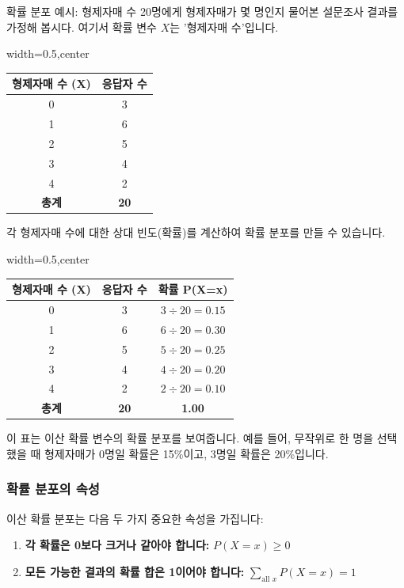 \documentclass[11pt,a4paper]{article}
\theoremstyle{definition}
\begin{document}
\begin{examplebox}{확률 분포 예시: 형제자매 수}
20명에게 형제자매가 몇 명인지 물어본 설문조사 결과를 가정해 봅시다. 여기서 확률 변수 \(X\)는 '형제자매 수'입니다.

\begin{adjustbox}{width=0.5\textwidth,center}
\begin{tabular}{cc}
\toprule
\textbf{형제자매 수 (X)} & \textbf{응답자 수} \\
\midrule
0 & 3 \\
1 & 6 \\
2 & 5 \\
3 & 4 \\
4 & 2 \\
\midrule
\textbf{총계} & \textbf{20} \\
\bottomrule
\end{tabular}
\end{adjustbox}

각 형제자매 수에 대한 상대 빈도(확률)를 계산하여 확률 분포를 만들 수 있습니다.

\begin{adjustbox}{width=0.5\textwidth,center}
\begin{tabular}{ccc}
\toprule
\textbf{형제자매 수 (X)} & \textbf{응답자 수} & \textbf{확률 P(X=x)} \\
\midrule
0 & 3 & \(3 \div 20 = 0.15\) \\
1 & 6 & \(6 \div 20 = 0.30\) \\
2 & 5 & \(5 \div 20 = 0.25\) \\
3 & 4 & \(4 \div 20 = 0.20\) \\
4 & 2 & \(2 \div 20 = 0.10\) \\
\midrule
\textbf{총계} & \textbf{20} & \textbf{1.00} \\
\bottomrule
\end{tabular}
\end{adjustbox}

이 표는 이산 확률 변수의 확률 분포를 보여줍니다. 예를 들어, 무작위로 한 명을 선택했을 때 형제자매가 0명일 확률은 15\%이고, 3명일 확률은 20\%입니다.
\end{examplebox}

\subsubsection*{확률 분포의 속성}
이산 확률 분포는 다음 두 가지 중요한 속성을 가집니다:
\begin{enumerate}
    \item \textbf{각 확률은 0보다 크거나 같아야 합니다:} \(P(X=x) \ge 0\)
    \item \textbf{모든 가능한 결과의 확률 합은 1이어야 합니다:} \( \sum_{\text{all } x} P(X=x) = 1 \)
\end{enumerate}
\end{document}
